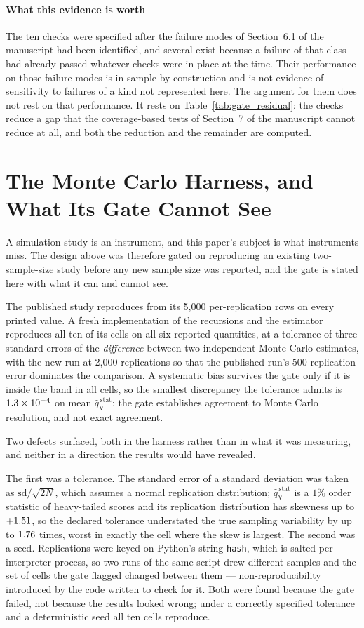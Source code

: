 \documentclass[preprint,11pt,authoryear]{elsarticle}
\newcommand{\1}{\boldsymbol{1}}
\newcommand{\qVstat}{\hat{q}_{\scriptscriptstyle\mathrm{V}}^{\,\mathrm{stat}}}
\begin{document}
\paragraph{What this evidence is worth} The ten checks were specified after the
failure modes of Section~6.1 of the manuscript had been identified, and several
exist because a failure of that class had already passed whatever checks were in
place at the time. Their performance on those failure modes is in-sample by
construction and is not evidence of sensitivity to failures of a kind not
represented here. The argument for them does not rest on that performance. It
rests on Table~\ref{tab:gate_residual}: the checks reduce a gap that the
coverage-based tests of Section~7 of the manuscript cannot reduce at all, and both
the reduction and the remainder are computed.

\section{The Monte Carlo Harness, and What Its Gate Cannot See}
\label{app:mc_harness}

A simulation study is an instrument, and this paper's subject is what instruments
miss. The design above was therefore gated on reproducing an existing
two-sample-size study before any new sample size was reported, and the gate is
stated here with what it can and cannot see.

The published study reproduces from its 5{,}000 per-replication rows on every
printed value. A fresh implementation of the recursions and the estimator
reproduces all ten of its cells on all six reported quantities, at a tolerance of
three standard errors of the \emph{difference} between two independent Monte Carlo
estimates, with the new run at 2{,}000 replications so that the published run's
$500$-replication error dominates the comparison. A systematic bias survives the
gate only if it is inside the band in all \nSupReproCells{} cells,
so the smallest discrepancy the tolerance admits is $1.3\times 10^{-4}$ on mean
$\qVstat$: the gate establishes agreement to Monte Carlo resolution, and not
exact agreement.

Two defects surfaced, both in the harness rather than in what it was measuring,
and neither in a direction the results would have revealed.

The first was a tolerance. The standard error of a standard deviation was taken as
$\mathrm{sd}/\sqrt{2N}$, which assumes a normal replication distribution;
$\qVstat$ is a $1\%$ order statistic of heavy-tailed scores and its replication
distribution has skewness up to $+1.51$, so the declared tolerance understated the
true sampling variability by up to $1.76$ times, worst in exactly the cell where
the skew is largest. The second was a seed. Replications were keyed on Python's
string \texttt{hash}, which is salted per interpreter process, so two runs of the
same script drew different samples and the set of cells the gate flagged changed
between them --- non-reproducibility introduced by the code written to check for
it. Both were found because the gate failed, not because the results looked
wrong; under a correctly specified tolerance and a deterministic seed all ten
cells reproduce.
\end{document}
